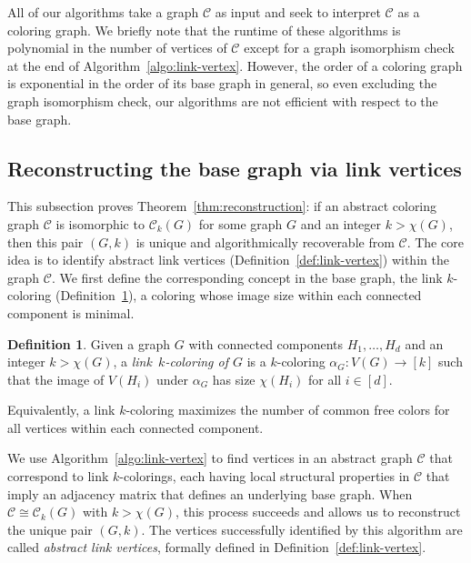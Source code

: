 \documentclass{amsart}
\theoremstyle{hypothesisstyle}
\theoremstyle{definition}
\newtheorem{definition}[theorem]{Definition}
\theoremstyle{remark}
\numberwithin{equation}{section}
\begin{document}
All of our algorithms take a graph $\mathcal C$ as input and seek to interpret $\mathcal C$ as a coloring graph.
We briefly note that the runtime of these algorithms is polynomial in the number of vertices of $\mathcal C$ except for a graph isomorphism check at the end of Algorithm~\ref{algo:link-vertex}. However, the order of a coloring graph is exponential in the order of its base graph in general, so even excluding the graph isomorphism check, our algorithms are not efficient with respect to the base graph.

 
\subsection{Reconstructing the base graph via link vertices}\label{subsect:reconstruction} This subsection proves Theorem~\ref{thm:reconstruction}: if an abstract coloring graph $\mathcal{C}$ is isomorphic to $\mathcal{C}_k(G)$ for some graph $G$ and an integer $k>\chi(G)$, then this pair $(G, k)$ is unique and algorithmically recoverable from $\mathcal{C}$. The core idea is to identify abstract link vertices (Definition~\ref{def:link-vertex}) within the graph $\mathcal{C}$. We first define the corresponding concept in the base graph, the link $k$-coloring (Definition~\ref{def:link-coloring}), a coloring whose image size within each connected component is minimal.

\begin{definition}\label{def:link-coloring}
    Given a graph $G$ with connected components $H_1,\dots,H_d$  and an integer $k>\chi(G)$, a \emph{link~$k$-coloring of $G$} is a $k$-coloring $\alpha_G\colon V(G)\to [k]$ such that the image of $V(H_i)$ under $\alpha_G$ has size $\chi(H_i)$ for all $i\in[d]$. 
\end{definition}

Equivalently, a link $k$-coloring maximizes the number of common free colors for all vertices within each connected component.

We use Algorithm~\ref{algo:link-vertex} to find vertices in an abstract graph $\mathcal{C}$ that correspond to link $k$-colorings, each having local structural properties in $\mathcal C$ that imply an adjacency matrix that defines an underlying base graph. When $\mathcal{C}\cong \mathcal{C}_k(G)$ with $k>\chi(G)$, this process succeeds and allows us to reconstruct the unique pair $(G, k)$. The vertices successfully identified by this algorithm are called \emph{abstract link vertices}, formally defined in Definition~\ref{def:link-vertex}.
\end{document}
